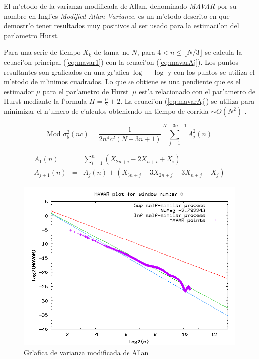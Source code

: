 El m'etodo de la varianza modificada de Allan, denominado {\it MAVAR} por su
nombre en Ingl'es {\it Modified Allan Variance}, es un m'etodo descrito en
\cite{MAVARStefano} que demostr'o tener resultados muy positivos al ser usado
para la estimaci'on del par'ametro Hurst.

Para una serie de tiempo $X_k$ de tama~no $N$, para 
$4 < n \le \lfloor N/3 \rfloor$ se calcula la ecuaci'on principal
(\ref{eq:mavar1}) con la ecuaci'on (\ref{eq:mavarAj}). Los puntos resultantes
son graficados en una gr'afica $\log - \log$ y con los puntos se utiliza el
m'etodo de m'inimos cuadrados. Lo que se obtiene es una pendiente que es el
estimador $\mu$ para el par'ametro de Hurst. $\mu$ est'a relacionado con el
par'ametro de Hurst mediante la f'ormula $H = \frac{\mu}{2} + 2$. La ecuaci'on
(\ref{eq:mavarAj}) se utiliza para minimizar el n'umero de c'alculos obteniendo
un tiempo de corrida $\sim O(N^2)$ \cite{582701}. 

\begin{equation}
\label{eq:mavar1}
\text{Mod } \sigma_y^2 (n c) = \frac{1}{2 n^4 c^2 (N - 3n + 1)} \sum_{j=1}^{N - 3n + 1}{A_j^2(n)}
\end{equation}

\begin{eqnarray}
\label{eq:mavarAj}
A_1(n)  & = & \sum_{i=1}^{n}{(X_{2n+i} - 2X_{n+i} + X_{i})} \nonumber \\
A_{j+1}(n) & = & A_j(n) + (X_{3n + j} - 3X_{2n + j} + 3X_{n+j} - X_{j})
\end{eqnarray}

\begin{figure}[h]
\centering
\includegraphics[scale=0.4,type=png,ext=.png,read=.png]{figures/mavarplot}
\caption{Gr'afica de varianza modificada de Allan}
\label{fig:mavarplot}
\end{figure}

